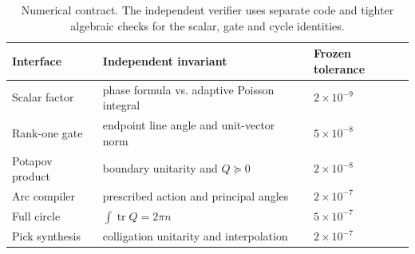 \documentclass[11pt]{article}
\theoremstyle{definition}
\theoremstyle{remark}
\newcommand{\tr}{\operatorname{tr}}
\begin{document}
\begin{table}[h]
\centering
\small
\begin{tabular}{@{}lll@{}}
\toprule
Interface & Independent invariant & Frozen tolerance \\
\midrule
Scalar factor & phase formula vs. adaptive Poisson integral & $2\times10^{-9}$ \\
Rank-one gate & endpoint line angle and unit-vector norm & $5\times10^{-8}$ \\
Potapov product & boundary unitarity and $Q\succeq0$ & $2\times10^{-8}$ \\
Arc compiler & prescribed action and principal angles & $2\times10^{-7}$ \\
Full circle & $\int\tr Q=2\pi n$ & $5\times10^{-7}$ \\
Pick synthesis & colligation unitarity and interpolation & $2\times10^{-7}$ \\
\bottomrule
\end{tabular}
\caption{Numerical contract.  The independent verifier uses separate code
and tighter algebraic checks for the scalar, gate and cycle identities.}
\label{tab:verification}
\end{table}



\end{document}
